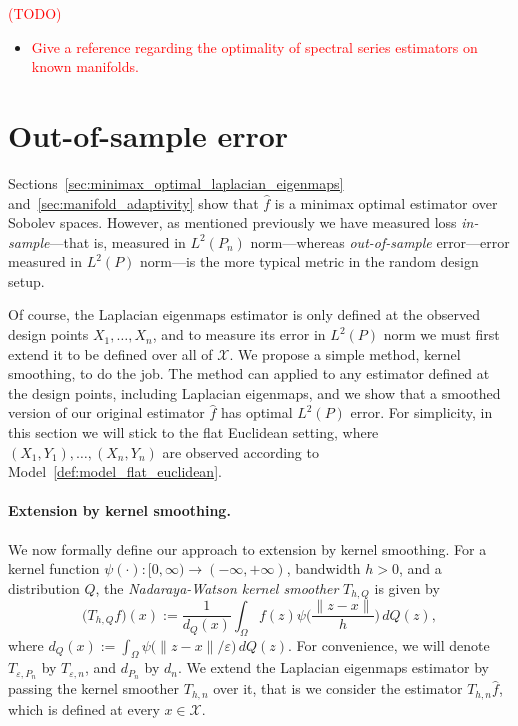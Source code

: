 \documentclass{article}
\newcommand{\1}{\mathbf{1}}
\newcommand{\Xset}{\mathcal{X}}
\newcommand{\Leb}{L}
\newcommand{\mc}[1]{\mathcal{#1}}
\newcommand{\wh}[1]{\widehat{#1}}
\theoremstyle{alden}
\theoremstyle{aldenthm}
\theoremstyle{definition}
\theoremstyle{remark}
\begin{document}
\textcolor{red}{(TODO)}
\begin{itemize}
	\item \textcolor{red}{Give a reference regarding the optimality of spectral series estimators on known manifolds.}
\end{itemize}

\section{Out-of-sample error}
\label{sec:out_of_sample}
Sections~\ref{sec:minimax_optimal_laplacian_eigenmaps} and~\ref{sec:manifold_adaptivity} show that $\wh{f}$ is a minimax optimal estimator over Sobolev spaces. However, as mentioned previously we have measured loss \emph{in-sample}---that is, measured in $\Leb^2(P_n)$ norm---whereas \emph{out-of-sample} error---error measured in $L^2(P)$ norm---is the more typical metric in the random design setup.

Of course, the Laplacian eigenmaps estimator is only defined at the observed design points $X_1,\ldots,X_n$, and to measure its error in $L^2(P)$ norm we must first extend it to be defined over all of $\Xset$. We propose a simple method, kernel smoothing, to do the job. The method can applied to any estimator defined at the design points, including Laplacian eigenmaps, and we show that a smoothed version of our original estimator $\wh{f}$ has optimal $L^2(P)$ error. For simplicity, in this section we will stick to the flat Euclidean setting, where $(X_1,Y_1),\ldots,(X_n,Y_n)$ are observed according to Model~\ref{def:model_flat_euclidean}.

\paragraph{Extension by kernel smoothing.}
We now formally define our approach to extension by kernel smoothing. For a kernel function $\psi(\cdot): [0,\infty) \to (-\infty,+\infty)$, bandwidth $h > 0$, and a distribution $Q$, the \emph{Nadaraya-Watson kernel smoother} $T_{h,Q}$ is given by
\begin{equation*}
\bigl(T_{h,Q}f)(x) := \frac{1}{d_Q(x)} \int_{\Omega} f(z)\psi\biggl(\frac{\|z - x\|}{h}\biggr) \,dQ(z),
\end{equation*}
where $d_Q(x) := \int_{\Omega} \psi\bigl(\|z - x\|/\varepsilon\bigr) \,dQ(z)$. For convenience, we will denote $T_{\varepsilon,P_n}$ by $T_{\varepsilon,n}$, and $d_{P_n}$ by $d_n$.  We extend the Laplacian eigenmaps estimator by passing the kernel smoother $T_{h,n}$ over it, that is we consider the estimator $T_{h,n}\wh{f}$, which is defined at every $x \in \mc{X}$.
\end{document}
